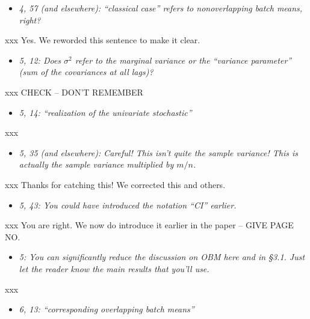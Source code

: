 \documentclass[11pt,notitlepage,onecolumn]{article}
\newcommand{\noi}{\noindent}
\begin{document}
\begin{itemize}
\item[] \textit{4, 57 (and elsewhere): ``classical case'' refers to nonoverlapping batch means, right?}
\end{itemize}

\noi
xxx  Yes. 
We reworded this sentence to make it clear.
\medskip 



\begin{itemize}
\item[] \textit{5, 12: Does $\sigma^2$ refer to the marginal variance or the ``variance parameter'' (sum of the covariances at all lags)?}
\end{itemize}

\noi
xxx   CHECK -- DON'T REMEMBER
\medskip 



\begin{itemize}
\item[] \textit{5, 14: ``realization of the univariate stochastic''}
\end{itemize}

\noi
xxx  
\medskip 


\begin{itemize}
\item[] \textit{5, 35 (and elsewhere): Careful! This isn't quite the sample variance! This is actually the sample variance multiplied by $m/n$.}
\end{itemize}

\noi
xxx  Thanks for catching this! We corrected this and others.
\medskip 


\begin{itemize}
\item[] \textit{5, 43: You could have introduced the notation ``CI'' earlier.}
\end{itemize}

\noi
xxx  You are right. 
We now do introduce it earlier in the paper -- GIVE PAGE NO.
\medskip 



\begin{itemize}
\item[] \textit{5: You can significantly reduce the discussion on OBM here and in \S 3.1. 
Just let the reader know the main results that you'll use.}
\end{itemize}

\noi
xxx  
\medskip 



\begin{itemize}
\item[] \textit{6, 13: ``corresponding overlapping batch means''}
\end{itemize}
\end{document}
